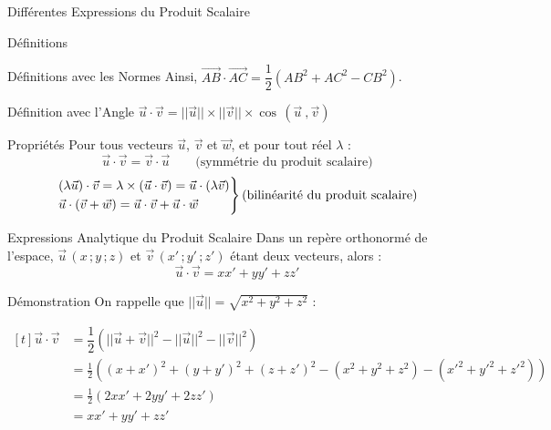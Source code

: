 \documentclass{coursbook}
\begin{document}
\begin{Gpartie}{Différentes Expressions du Produit Scalaire}
\begin{Spartie}{Définitions}
\begin{SSpartie}{Définitions avec les Normes}
                Ainsi, $\overrightarrow{AB}\cdot\overrightarrow{AC}=\dfrac{1}{2}\left(AB^2+AC^2-CB^2\right)$.
            \end{SSpartie}
            \begin{SSpartie}{Définition avec l'Angle} 
                $\vec{u}\cdot\vec{v}=\lvert\lvert\vec{u}\rvert\rvert\times\lvert\lvert\vec{v}\rvert\rvert\times\cos\,\left(\vec{u}~,\vec{v}\right)$
            \end{SSpartie}
        \end{Spartie}
        \begin{Spartie}{Propriétés} 
            Pour tous vecteurs $\vec{u}$, $\vec{v}$ et $\vec{w}$, et pour tout réel $\lambda$ : \[\vec{u}\cdot\vec{v}=\vec{v}\cdot\vec{u}\qquad\text{(symmétrie du produit scalaire)}\] \[\begin{drcases}\left(\lambda\vec{u}\right)\cdot\vec{v}=\lambda\times\left(\vec{u}\cdot\vec{v}\right)=\vec{u}\cdot\left(\lambda\vec{v}\right) \\ \vec{u}\cdot\left(\vec{v}+\vec{w}\right)=\vec{u}\cdot\vec{v}+\vec{u}\cdot\vec{w}\end{drcases}\text{(bilinéarité du produit scalaire)}\]
        \end{Spartie}
        \begin{Spartie}{Expressions Analytique du Produit Scalaire} 
            Dans un repère orthonormé de l'espace, $\vec{u}\,\left(x\,; y\,; z\right)$ et $\vec{v}\,\left(x'\,; y'\,; z'\right)$ étant deux vecteurs, alors : \[\vec{u}\cdot\vec{v}=xx'+yy'+zz'\] 
            \begin{SSpartie}{Démonstration} 
                On rappelle que $\lvert\lvert\vec{u}\rvert\rvert=\sqrt{x^2+y^2+z^2}$ :

                $\begin{aligned}[t]
                    \vec{u}\cdot\vec{v}&=\dfrac{1}{2}\left(\lvert\lvert\vec{u}+\vec{v}\rvert\rvert^2-\lvert\lvert\vec{u}\rvert\rvert^2-\lvert\lvert\vec{v}\rvert\rvert^2\right) \\
                    &=\frac{1}{2}\left(\left(x+x'\right)^2+\left(y+y'\right)^2+\left(z+z'\right)^2-\left(x^2+y^2+z^2\right)-\left(x'^2+y'^2+z'^2\right)\right) \\
                    &=\frac{1}{2}\left(2xx'+2yy'+2zz'\right) \\
                    &=xx'+y y'+z z'
                \end{aligned}$
            \end{SSpartie}
        \end{Spartie}
    \end{Gpartie}
\end{document}
